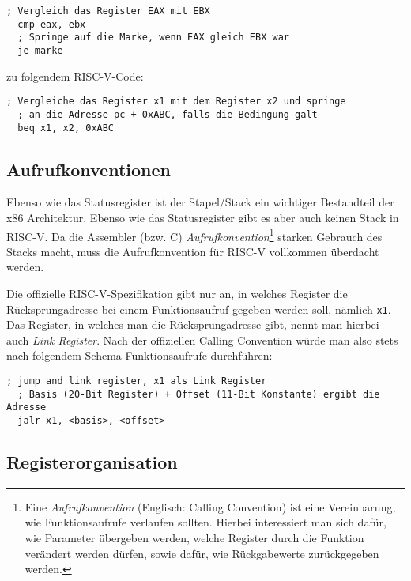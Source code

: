 \begin{lstlisting}[style=x86Assembler]
  ; Vergleich das Register EAX mit EBX
  cmp eax, ebx
  ; Springe auf die Marke, wenn EAX gleich EBX war
  je marke
\end{lstlisting}

zu folgendem RISC-V-Code:

\begin{lstlisting}[style=risc-v_Assembler]
  ; Vergleiche das Register x1 mit dem Register x2 und springe
  ; an die Adresse pc + 0xABC, falls die Bedingung galt
  beq x1, x2, 0xABC
\end{lstlisting}

\subsection{Aufrufkonventionen}

Ebenso wie das Statusregister ist der Stapel/Stack ein wichtiger Bestandteil der x86
Architektur. Ebenso wie das Statusregister gibt es aber auch keinen Stack in
RISC-V. Da die Assembler (bzw. C) \emph{Aufrufkonvention}\footnote{Eine
  \emph{Aufrufkonvention} (Englisch: Calling Convention) ist eine Vereinbarung, wie Funktionsaufrufe verlaufen
  sollten. Hierbei interessiert man sich dafür, wie Parameter übergeben werden,
  welche Register durch die Funktion verändert werden dürfen, sowie dafür, wie
  Rückgabewerte zurückgegeben werden.} starken Gebrauch des Stacks macht,
muss die Aufrufkonvention für RISC-V vollkommen überdacht werden.

Die offizielle RISC-V-Spezifikation gibt nur an, in welches Register die
Rücksprungadresse bei einem Funktionsaufruf gegeben werden soll, nämlich
\lstinline[style=risc-v_Assembler]!x1!. Das Register, in welches man die Rücksprungadresse gibt, nennt man
hierbei auch \emph{Link Register}. Nach der offiziellen Calling Convention würde
man also stets nach folgendem Schema Funktionsaufrufe durchführen:

\begin{lstlisting}[style=risc-v_Assembler]
  ; jump and link register, x1 als Link Register
  ; Basis (20-Bit Register) + Offset (11-Bit Konstante) ergibt die Adresse
  jalr x1, <basis>, <offset>
\end{lstlisting}

\subsection{Registerorganisation}


